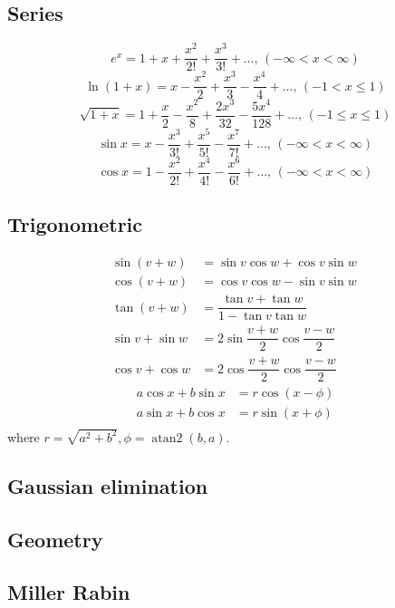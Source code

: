 \documentclass[A4 paper, 12pt, oneside]{article}
\begin{document}
\begin{multicols}{2}
    \subsection{Series}
    $$e^x = 1+x+\frac{x^2}{2!}+\frac{x^3}{3!}+\dots,\,(-\infty<x<\infty)$$
    $$\ln(1+x) = x-\frac{x^2}{2}+\frac{x^3}{3}-\frac{x^4}{4}+\dots,\,(-1<x\leq1)$$
    $$\sqrt{1+x} = 1+\frac{x}{2}-\frac{x^2}{8}+\frac{2x^3}{32}-\frac{5x^4}{128}+\dots,\,(-1\leq x\leq1)$$
    $$\sin x = x-\frac{x^3}{3!}+\frac{x^5}{5!}-\frac{x^7}{7!}+\dots,\,(-\infty<x<\infty)$$
    $$\cos x = 1-\frac{x^2}{2!}+\frac{x^4}{4!}-\frac{x^6}{6!}+\dots,\,(-\infty<x<\infty)$$
    
    \subsection{Trigonometric}
    \begin{align*}
        \sin(v+w)&= \sin v\cos w+\cos v\sin w \\
        \cos(v+w)&=\cos v\cos w-\sin v\sin w\ \\
        \tan(v+w)&=\dfrac{\tan v+\tan w}{1-\tan v\tan w} \\
        \sin v+\sin w&=2\sin\dfrac{v+w}{2}\cos\dfrac{v-w}{2} \\
        \cos v+\cos w&=2\cos\dfrac{v+w}{2}\cos\dfrac{v-w}{2} 
    \end{align*}
    \begin{align*}
        a\cos x+b\sin x&=r\cos(x-\phi)\\
        a\sin x+b\cos x&=r\sin(x+\phi)\\
    \end{align*}
    where $r=\sqrt{a^2+b^2}, \phi=\operatorname{atan2}(b,a)$.

	\subsection{Gaussian elimination}
		    

	\subsection{Geometry}
	
	
	\subsection{Miller Rabin}
	


\end{multicols}
\end{document}
